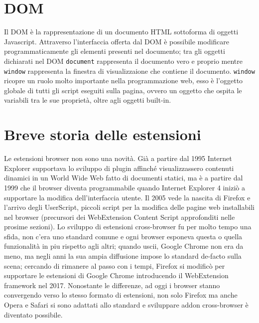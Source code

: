 \documentclass{sapthesis}
\newcommand{\code}[1]{\texttt{#1}}
\newcommand{\JS}{Javascript}
\begin{document}
    \section{DOM}
    \label{sec:dom}
        Il DOM è la rappresentazione di un documento HTML sottoforma di oggetti \JS \cite{dom-introduction}. 
        Attraverso l'interfaccia offerta dal DOM è possibile modificare programmaticamente gli elementi presenti
        nel documento; tra gli oggetti dichiarati nel DOM \code{document} rappresenta il documento vero e proprio
        mentre \code{window} rappresenta la finestra di visualizzaione che contiene il documento.
        \code{window} ricopre un ruolo molto importante nella programmazione web, esso è l'oggetto globale 
        di tutti gli script eseguiti sulla pagina, ovvero un oggetto che ospita le variabili tra le
        sue proprietà, oltre agli oggetti built-in.

    \section{Breve storia delle estensioni}
    \label{breve_storia_delle_estensioni}
        Le estensioni browser non sono una novità. Già a partire dal 1995 Internet Explorer
        supportava lo sviluppo di plugin \cite{extension-history} affinché visualizzassero contenuti
        dinamici in un World Wide Web fatto di documenti statici, ma è a partire dal 1999 che
        il browser diventa programmabile quando Internet Explorer 4 iniziò a supportare la modifica
        dell'interfaccia utente. Il 2005 vede la nascita di Firefox e l'arrivo degli UserScript,
        piccoli script per la modifica delle pagine web installabili nel browser (precursori dei
        WebExtension Content Script approfonditi nelle prosime sezioni).
        Lo sviluppo di estensioni cross-browser fu per molto tempo una sfida, non c'era uno standard
        comune e ogni browser esponeva questa o quella funzionalità in piu rispetto agli altri; quando
        uscii, Google Chrome non era da meno, ma negli anni la sua ampia diffusione impose lo standard
        de-facto sulla scena; cercando di rimanere al passo con i tempi, Firefox si modificò per
        supportare le estensioni di Google Chrome introducendo il WebExtension framework nel 2017.
        Nonostante le differenze, ad oggi i browser stanno convergendo verso lo stesso formato di estensioni,
        non solo Firefox ma anche Opera e Safari si sono adattati allo standard e sviluppare addon
        cross-browser è diventato possibile.
\end{document}
